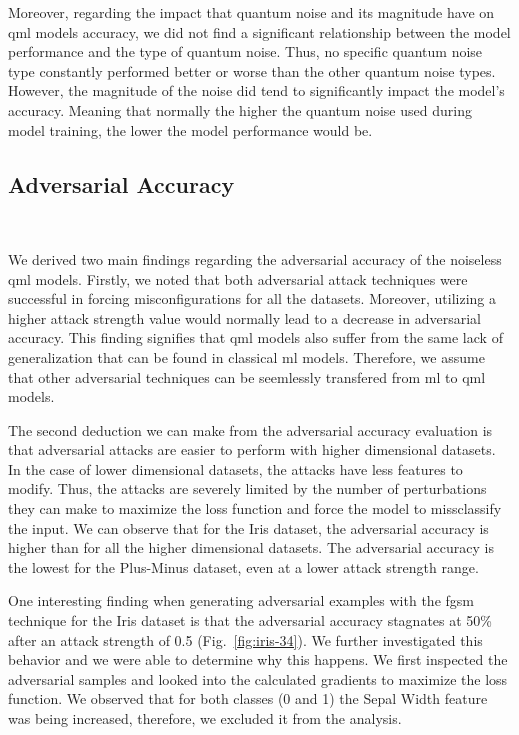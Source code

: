 Moreover, regarding the impact that quantum noise and its
magnitude have on \ac{qml} models accuracy, we did not find
a significant relationship between the model performance
and the type of quantum noise. Thus, no specific quantum
noise type constantly performed better or worse than the
other quantum noise types. However, the magnitude of the
noise did tend to significantly impact the model's accuracy.
Meaning that normally the higher the quantum noise used
during model training, the lower the model performance would
be. \

\subsection{Adversarial Accuracy}\label{subsection:model_adv_acc} \

We derived two main findings regarding the adversarial accuracy
of the noiseless \ac{qml} models. Firstly, we noted that both
adversarial attack techniques were successful in forcing
misconfigurations for all the datasets. Moreover, utilizing
a higher attack strength value would normally lead to a
decrease in adversarial accuracy. This finding signifies
that \ac{qml} models also suffer from the same lack of generalization
that can be found in classical \ac{ml} models. Therefore, we assume
that other adversarial techniques can be seemlessly transfered
from \ac{ml} to \ac{qml} models. \

The second deduction we can make from the adversarial
accuracy evaluation is that adversarial attacks are
easier to perform with higher dimensional datasets. 
In the case of lower dimensional datasets, the attacks have
less features to modify. Thus, the attacks are severely limited
by the number of perturbations they can make to maximize
the loss function and force the model to missclassify the
input. We can observe that for the Iris dataset, the
adversarial accuracy is higher than for all the higher
dimensional datasets. The adversarial accuracy is
the lowest for the Plus-Minus dataset, even at a
lower attack strength range. \

One interesting finding when generating adversarial examples
with the \ac{fgsm} technique for the Iris dataset is that
the adversarial accuracy stagnates at 50\% after an attack strength
of 0.5 (Fig.~\ref{fig:iris-34}). We further investigated
this behavior and we were able to determine why this happens.
We first inspected the adversarial samples and looked into the
calculated gradients to maximize the loss function. We observed
that for both classes (0 and 1) the Sepal Width feature was
being increased, therefore, we excluded it from the analysis. \

